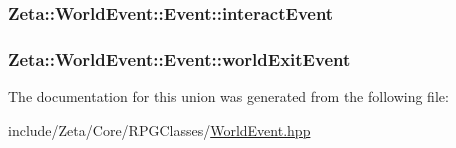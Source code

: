 \hypertarget{unionZeta_1_1WorldEvent_1_1Event_a6a15dbd736564d471da9539d726eb0b7}{
\subsubsection[{interact\+Event}]{ Zeta\+::\+World\+Event\+::\+Event\+::interact\+Event}}\label{unionZeta_1_1WorldEvent_1_1Event_a6a15dbd736564d471da9539d726eb0b7}
\hypertarget{unionZeta_1_1WorldEvent_1_1Event_afce93a16f939122fc59048073f235613}{
\subsubsection[{world\+Exit\+Event}]{ Zeta\+::\+World\+Event\+::\+Event\+::world\+Exit\+Event}}\label{unionZeta_1_1WorldEvent_1_1Event_afce93a16f939122fc59048073f235613}


The documentation for this union was generated from the following file\+:\begin{DoxyCompactItemize}
\item 
include/\+Zeta/\+Core/\+R\+P\+G\+Classes/\hyperlink{WorldEvent_8hpp}{World\+Event.\+hpp}\end{DoxyCompactItemize}
